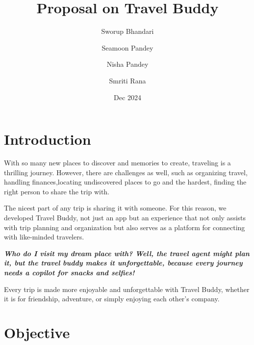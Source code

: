 \documentclass[12pt,a4paper]{report}
\title{Proposal on Travel Buddy}
\author{Sworup Bhandari}
\author{Seamoon Pandey}
\author{Nisha Pandey}
\author{Smriti Rana}
\date{Dec 2024}
\begin{document}
\gdef \title{How to prepare a Seminar report using \LaTeX } %
\gdef \author{Student Name}	 %
\gdef \dept{Electronics  Engineering} %
\gdef \degree{Diploma } %
\gdef \branch{Electronics  Engineering} %
\gdef \college{Government Polytechnic College}
\gdef \collegeplace{Palakkad}
\gdef \rollno{TVE17EC0XY} %
\gdef \deptabbr{Dept.of Electronics} %
\gdef \guide{Lecture-1}
\gdef \hod{Dr. Dileep P} %
\gdef \hoddes{Professor and Head} %

\gdef \acadyear{2024 - 25} %
\gdef \month{November 2024} %
\gdef \date{21-11-2020} %
\setcounter{secnumdepth}{1} 


%
 



\thispagestyle{empty}
\newpage
\tableofcontents
\listoffigures

\cleardoublepage
\setcounter{page}{1}
\chapter{ Introduction}
With so many new places to discover and memories to create, traveling is a thrilling journey. However, there are challenges as well, such as organizing travel, handling finances,locating undiscovered places to go and the hardest, finding the right person to share the trip with. 

The nicest part of any trip is sharing it with someone. For this reason, we developed Travel Buddy, not just an app but an experience that not only assists with trip planning and organization but also serves as a platform for connecting with like-minded travelers.

\textbf{\textit{Who do I visit my dream place with? Well, the travel agent might plan it, but the travel buddy makes it unforgettable, because every journey needs a copilot for snacks and selfies!}}

Every trip is made more enjoyable and unforgettable with Travel Buddy, whether it is for friendship, adventure, or simply enjoying each other's company.

\chapter{Objective}
\end{document}
